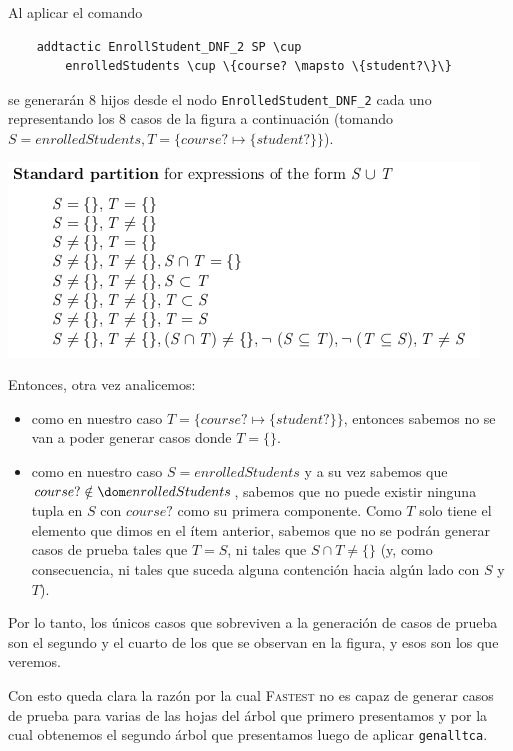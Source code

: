 \documentclass{article}
\begin{document}
Al aplicar el comando

\begin{verbatim}
    addtactic EnrollStudent_DNF_2 SP \cup 
        enrolledStudents \cup \{course? \mapsto \{student?\}\}
\end{verbatim}

se generarán 8 hijos desde el nodo \verb|EnrolledStudent_DNF_2| cada uno representando los 8 casos de la figura a continuación (tomando $S = enrolledStudents, T = \{course? \mapsto \{student?\}\}$).

\begin{center}
    \includegraphics[scale=0.7]{particioncup.png}
\end{center}

Entonces, otra vez analicemos:

\begin{itemize}
    \item como en nuestro caso $T = \{course? \mapsto \{student?\}\}$, entonces sabemos no se van a poder generar casos donde $T = \{\}$.
    \item como en nuestro caso $S = enrolledStudents$ y a su vez sabemos que $course? \notin \dom enrolledStudents$, sabemos que no puede existir ninguna tupla en $S$ con $course?$ como su primera componente. Como $T$ solo tiene el elemento que dimos en el ítem anterior, sabemos que no se podrán generar casos de prueba tales que $T = S$, ni tales que $S \cap T \neq \{\}$ (y, como consecuencia, ni tales que suceda alguna contención hacia algún lado con $S$ y $T$).
\end{itemize}

Por lo tanto, los únicos casos que sobreviven a la generación de casos de prueba son el segundo y el cuarto de los que se observan en la figura, y esos son los que veremos.

Con esto queda clara la razón por la cual \textsc{Fastest} no es capaz de generar casos de prueba para varias de las hojas del árbol que primero presentamos y por la cual obtenemos el segundo árbol que presentamos luego de aplicar \verb|genalltca|.
\end{document}
